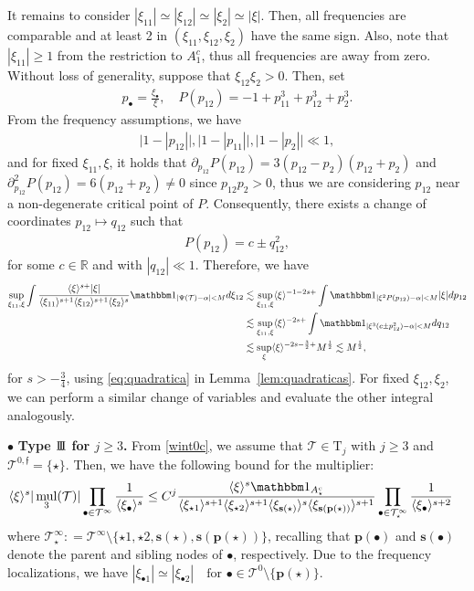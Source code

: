 \documentclass[a4paper,
11pt,  reqno]{amsart}
\newcommand{\III}{\textup{I \hspace{-2.9mm} I \hspace{-2.9mm} I}}
\newcommand{\5}{\textup{V}}
\newcommand{\noi}{\noindent}
\newcommand{\ind}{\mathbbm 1}
\newcommand{\les}{\lesssim}
\theoremstyle{remark}
\newcommand{\R}{\mathbb{R}}
\newcommand{\bul}{\bullet}
\newcommand{\TT}{\mathcal{T}}
\newcommand{\Tr}{\mathrm{T}}
\newcommand{\al}{\alpha}
\newcommand{\pb}{\mathbf{p}}
\newcommand{\sbf}{\mathbf{s}}
\newcommand{\jb}[1]
{\langle #1 \rangle}
\newcommand{\ff}{\mathfrak{f}}
\DeclareMathOperator{\mul}{mul}
\numberwithin{equation}{section}
\numberwithin{theorem}{section}
\begin{document}
It remains to consider $|\xi_{11}| \simeq |\xi_{12}| \simeq |\xi_2| \simeq |\xi|$. Then, all frequencies are comparable and at least 2 in $(\xi_{11}, \xi_{12}, \xi_2)$ have the same sign.
Also, note that $|\xi_{11}| \ge 1$ from the restriction to $A_1^c$, thus all frequencies are away from zero.
Without loss of generality, suppose that $\xi_{12} \xi_2 >0$. Then, set
\begin{align}
    p_\bul = \frac{\xi_\bul}{\xi}, \quad P(p_{12}) = - 1 + p_{11}^3 + p_{12}^3 + p_2^3.
\end{align}
From the frequency assumptions, we have
\begin{align}
    \big| 1 - |p_{12}| \big| ,
    \big| 1 - |p_{11}| \big| ,
    \big| 1 - |p_{2}| \big| \ll 1,
\end{align}
and for fixed $\xi_{11}, \xi$, it holds that $\partial_{p_{12}} P(p_{12}) = 3 (p_{12} - p_2) (p_{12} + p_2) $ and $\partial^2_{p_{12}}P(p_{12}) = 6 (p_{12} + p_2) \ne 0$ since $p_{12}p_2 >0$, thus we are considering $p_{12}$ near a non-degenerate critical point of $P$. Consequently, there exists a change of coordinates $p_{12} \mapsto q_{12}$ such that
\begin{align}
    P(p_{12}) = c \pm q_{12}^2,
\end{align}
for some $c\in\R$
and with $|q_{12}| \ll 1$. Therefore, we have
\begin{align}
\sup_{\xi_{11}, \xi} \int
\frac{\jb{\xi}^{s+} |\xi|  }{ \jb{\xi_{11}}^{s+1} \jb{\xi_{12}}^{s+1} \jb{\xi_{2}}^s}
    \ind_{|\Psi(\TT)- \al | < M } d\xi_{12}
    &
    \les \sup_{\xi_{11}, \xi}
    \jb{\xi}^{-1-2s+}
    \int \ind_{|\xi^2P(p_{12}) - \al | < M } |\xi| d p_{12}
    \\
    &
    \les \sup_{\xi_{11}, \xi}
    \jb{\xi}^{-2s+}
    \int \ind_{|\xi^3(c \pm p_{12}^2) - \al| < M} dq_{12}
    \\
    &
    \les \sup_\xi \jb{\xi}^{-2s - \frac32 + } M^\frac12 \les M^\frac12,
\end{align}
for $s>-\frac34$, using \eqref{eq:quadratica} in  Lemma~\ref{lem:quadraticas}. For fixed $\xi_{12}, \xi_2$, we can perform a similar change of variables and evaluate the other integral analogously.


\smallskip
\noi
$\bul$ \textbf{Type $\III$ for $j\ge 3$.}
From \eqref{wint0c}, we assume that $\TT \in \Tr_j$ with $j\ge3$ and $\TT^{0,\ff} = \{\star\}$. Then,  we have the following bound for the multiplier:
\begin{align}
    \jb{\xi}^s | \mul_3 (\TT)|
    \prod_{\bul \in \TT^\infty} \frac{1}{\jb{\xi_\bul}^s}
    &
    \le C^j
    \frac{\jb{\xi}^{s} \ind_{A_\star^c} }{ \jb{\xi_{\star1}}^{s+1} \jb{\xi_{\star2}}^{s+1} \jb{\xi_{\sbf(\star)}}^s \jb{\xi_{\sbf(\pb(\star))}}^{s+1}} \prod_{\bul \in \TT^\infty_\star} \frac{1}{\jb{\xi_\bul}^{s+2}}
\end{align}
where $\TT^\infty_\star : = \TT^\infty \setminus \{\star1, \star2, \sbf(\star), \sbf(\pb(\star))\}$, recalling that $\pb(\bul)$ and $\sbf(\bul)$ denote the parent and sibling nodes of $\bul$, respectively.
Due to the frequency localizations, we have
$
    |\xi_{\bul1}| \simeq |\xi_{\bul2}| \quad \text{for } \bul \in \TT^0\setminus\{\pb(\star)\}
$.
\end{document}
